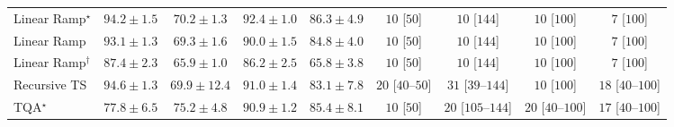 \begin{tabular}{l|cccc|cccc|}
Linear Ramp$^\star$ & {\cellcolor[HTML]{742905}} \color[HTML]{F1F1F1} $94.2\pm 1.5$ & {\cellcolor[HTML]{FFF3B4}} \color[HTML]{000000} $70.2\pm 1.3$ & {\cellcolor[HTML]{8E3104}} \color[HTML]{F1F1F1} $92.4\pm 1.0$ & {\cellcolor[HTML]{DA5C0A}} \color[HTML]{F1F1F1} $86.3\pm 4.9$ & {\cellcolor[HTML]{FFF6F2}} \color[HTML]{000000} $10$ [$50$] & {\cellcolor[HTML]{FFF6F2}} \color[HTML]{000000} $10$ [$144$] & {\cellcolor[HTML]{FFF6F2}} \color[HTML]{000000} $10$ [$100$] & {\cellcolor[HTML]{FFF6F2}} \color[HTML]{000000} $7$ [$100$] \\
Linear Ramp & {\cellcolor[HTML]{842E05}} \color[HTML]{F1F1F1} $93.1\pm 1.3$ & {\cellcolor[HTML]{FFF7BE}} \color[HTML]{000000} $69.3\pm 1.6$ & {\cellcolor[HTML]{AE3E03}} \color[HTML]{F1F1F1} $90.0\pm 1.5$ & {\cellcolor[HTML]{E76B11}} \color[HTML]{F1F1F1} $84.8\pm 4.0$ & {\cellcolor[HTML]{FFF6F2}} \color[HTML]{000000} $10$ [$50$] & {\cellcolor[HTML]{FFF6F2}} \color[HTML]{000000} $10$ [$144$] & {\cellcolor[HTML]{FFF6F2}} \color[HTML]{000000} $10$ [$100$] & {\cellcolor[HTML]{FFF6F2}} \color[HTML]{000000} $7$ [$100$] \\
Linear Ramp$^\dagger$ & {\cellcolor[HTML]{D05104}} \color[HTML]{F1F1F1} $87.4\pm 2.3$ & {\cellcolor[HTML]{FFFFE5}} \color[HTML]{000000} $65.9\pm 1.0$ & {\cellcolor[HTML]{DA5C0A}} \color[HTML]{F1F1F1} $86.2\pm 2.5$ & {\cellcolor[HTML]{FFFFE5}} \color[HTML]{000000} $65.8\pm 3.8$ & {\cellcolor[HTML]{FFF6F2}} \color[HTML]{000000} $10$ [$50$] & {\cellcolor[HTML]{FFF6F2}} \color[HTML]{000000} $10$ [$144$] & {\cellcolor[HTML]{FFF6F2}} \color[HTML]{000000} $10$ [$100$] & {\cellcolor[HTML]{FFF6F2}} \color[HTML]{000000} $7$ [$100$] \\
Recursive TS & {\cellcolor[HTML]{702806}} \color[HTML]{F1F1F1} $94.6\pm 1.3$ & {\cellcolor[HTML]{FFF5B8}} \color[HTML]{000000} $69.9\pm 12.4$ & {\cellcolor[HTML]{A13804}} \color[HTML]{F1F1F1} $91.0\pm 1.4$ & {\cellcolor[HTML]{F17C1A}} \color[HTML]{F1F1F1} $83.1\pm 7.8$ & {\cellcolor[HTML]{FFF3F0}} \color[HTML]{000000} $20$ [$40$--$50$] & {\cellcolor[HTML]{FEF1ED}} \color[HTML]{000000} $31$ [$39$--$144$] & {\cellcolor[HTML]{FFF6F2}} \color[HTML]{000000} $10$ [$100$] & {\cellcolor[HTML]{FFF3F0}} \color[HTML]{000000} $18$ [$40$--$100$] \\
TQA$^\star$ & {\cellcolor[HTML]{FEB945}} \color[HTML]{000000} $77.8\pm 6.5$ & {\cellcolor[HTML]{FED26D}} \color[HTML]{000000} $75.2\pm 4.8$ & {\cellcolor[HTML]{A33904}} \color[HTML]{F1F1F1} $90.9\pm 1.2$ & {\cellcolor[HTML]{E1640E}} \color[HTML]{F1F1F1} $85.4\pm 8.1$ & {\cellcolor[HTML]{FFF6F2}} \color[HTML]{000000} $10$ [$50$] & {\cellcolor[HTML]{FFF3F0}} \color[HTML]{000000} $20$ [$105$--$144$] & {\cellcolor[HTML]{FFF3F0}} \color[HTML]{000000} $20$ [$40$--$100$] & {\cellcolor[HTML]{FFF4F0}} \color[HTML]{000000} $17$ [$40$--$100$] \\

\end{tabular}
